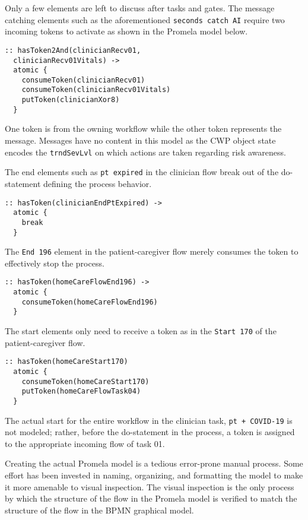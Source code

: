 Only a few elements are left to discuss after tasks and gates. The message catching elements such as the aforementioned \texttt{seconds catch AI} require two incoming tokens to activate as shown in the Promela model below.
%
{\small
\begin{lstlisting}[style=myPromela]
:: hasToken2And(clinicianRecv01, 
  clinicianRecv01Vitals) ->
  atomic {
    consumeToken(clinicianRecv01)
    consumeToken(clinicianRecv01Vitals)
    putToken(clinicianXor8)
  }
\end{lstlisting}
}
%
\noindent One token is from the owning workflow while the other token represents the message. Messages have no content in this model as the CWP object state encodes the \texttt{trndSevLvl} on which actions are taken regarding risk awareness.

The end elements such as \texttt{pt expired} in the clinician flow break out of the do-statement defining the process behavior.
%
{\small
\begin{lstlisting}[style=myPromela]
:: hasToken(clinicianEndPtExpired) ->
  atomic {
    break
  }
\end{lstlisting}
}
%
\noindent The \texttt{End 196} element in the patient-caregiver flow merely consumes the token to effectively stop the process.
%
{\small
\begin{lstlisting}[style=myPromela]
:: hasToken(homeCareFlowEnd196) ->
  atomic {
    consumeToken(homeCareFlowEnd196)
  }
\end{lstlisting}
}
% 
\noindent The start elements only need to receive a token as in the \texttt{Start 170} of the patient-caregiver flow.
%
{\small
\begin{lstlisting}[style=myPromela]
:: hasToken(homeCareStart170)
  atomic {
    consumeToken(homeCareStart170)
    putToken(homeCareFlowTask04)
  }
\end{lstlisting}
}
% 
\noindent The actual start for the entire workflow in the clinician task, \texttt{pt + COVID-19} is not modeled; rather, before the do-statement in the process, a token is assigned to the appropriate incoming flow of task 01.

Creating the actual Promela model is a tedious error-prone manual process. Some effort has been invested in naming, organizing, and formatting the model to make it more amenable to visual inspection. The visual inspection is the only process by which the structure of the flow in the Promela model is verified to match the structure of the flow in the BPMN graphical model.